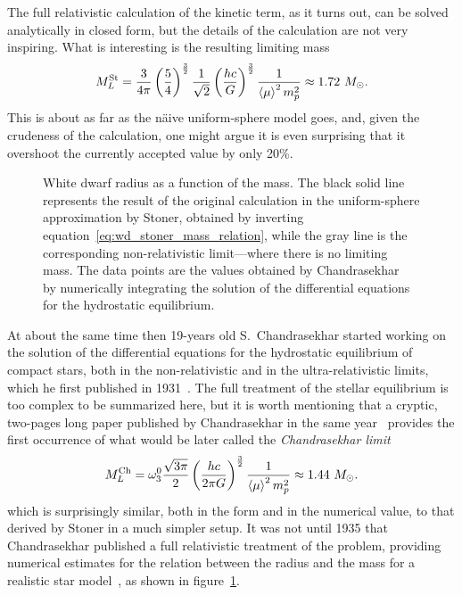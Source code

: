 The full relativistic calculation of the kinetic term, as it turns out, can be solved
analytically in closed form, but the details of the calculation are not very inspiring.
What is interesting is the resulting limiting mass
\begin{align}\label{eq:wd_mass_limit_stoner}
  M_{L}^\text{St} = \frac{3}{4\pi} \left( \frac{5}{4} \right)^\frac{3}{2} \frac{1}{\sqrt{2}}
  \left( \frac{hc}{G} \right)^\frac{3}{2} \frac{1}{\left<\mu\right>^2 m_p^2} \approx 1.72~M_\odot.
\end{align}
This is about as far as the n\"aive uniform-sphere model goes, and, given the
crudeness of the calculation, one might argue it is even surprising that it
overshoot the currently accepted value by only 20\%.

\begin{figure}[htbp!]
	
	\caption{White dwarf radius as a function of the mass. The black solid line
    represents the result of the original calculation in the uniform-sphere
    approximation by Stoner\cite{1930LEDPM...9..944S}, obtained by inverting
    equation~\eqref{eq:wd_stoner_mass_relation}, while the gray line is the
    corresponding non-relativistic limit---where there is no limiting mass.
    The data points are the values obtained by Chandrasekhar~\cite{1935MNRAS..95..207C}
    by numerically integrating the solution of the differential equations for
    the hydrostatic equilibrium.}
    \label{fig:wd_mass_radius}
\end{figure}

At about the same time then 19-years old S.~Chandrasekhar started working on the
solution of the differential equations for the hydrostatic equilibrium of compact
stars, both in the non-relativistic and in the ultra-relativistic limits, which
he first published in 1931~\cite{1931MNRAS..91..456C}. The full treatment of the
stellar equilibrium is too complex to be summarized here, but it is worth mentioning
that a cryptic, two-pages long paper published by Chandrasekhar in the same
year~\cite{1931ApJ....74...81C} provides the first occurrence of what would
be later called the \emph{Chandrasekhar limit}%
\begin{align}\label{eq:wd_mass_limit_chandra}
  M_{L}^\text{Ch} = \omega_3^0 \frac{\sqrt{3\pi}}{2}
  \left( \frac{hc}{2\pi G} \right)^\frac{3}{2} \frac{1}{\left<\mu\right>^2 m_p^2} \approx 1.44~M_\odot.
\end{align}
which is surprisingly similar, both in the form and in the numerical value, to
that derived by Stoner in a much simpler setup.
It was not until 1935 that Chandrasekhar published a full relativistic treatment
of the problem, providing numerical estimates for the relation between the radius
and the mass for a realistic star model~\cite{1935MNRAS..95..207C}, as shown in
figure~\ref{fig:wd_mass_radius}.

